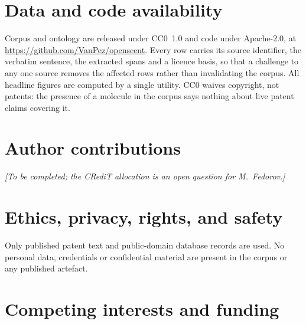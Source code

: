 \documentclass[
  computerscience
]{genesisl1-paper}
\begin{document}
\section*{Data and code availability}

Corpus and ontology are released under CC0~1.0 and code under Apache-2.0, at
\url{https://github.com/VanPez/openscent}. Every row carries its source identifier, the
verbatim sentence, the extracted spans and a licence basis, so that a challenge to any one
source removes the affected rows rather than invalidating the corpus. All headline
figures are computed by a single utility. CC0 waives copyright, not patents: the presence
of a molecule in the corpus says nothing about live patent claims covering it.


\section*{Author contributions}

\emph{[To be completed; the CRediT allocation is an open question for M.\ Fedorov.]}

\section*{Ethics, privacy, rights, and safety}

Only published patent text and public-domain database records are used. No personal data,
credentials or confidential material are present in the corpus or any published artefact.

\section*{Competing interests and funding}
\end{document}
